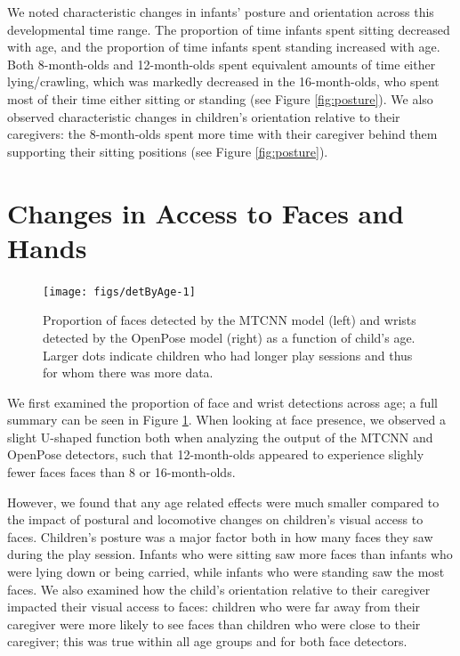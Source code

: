 \documentclass[10pt, letterpaper]{article}
\newenvironment{CodeChunk}{}{}
\begin{document}
We noted characteristic changes in infants' posture and orientation
across this developmental time range. The proportion of time infants
spent sitting decreased with age, and the proportion of time infants
spent standing increased with age. Both 8-month-olds and 12-month-olds
spent equivalent amounts of time either lying/crawling, which was
markedly decreased in the 16-month-olds, who spent most of their time
either sitting or standing (see Figure \ref{fig:posture}). We also
observed characteristic changes in children's orientation relative to
their caregivers: the 8-month-olds spent more time with their caregiver
behind them supporting their sitting positions (see Figure
\ref{fig:posture}).

\section{Changes in Access to Faces and
Hands}\label{changes-in-access-to-faces-and-hands}

\begin{CodeChunk}
\begin{figure}[h]

{\centering \texttt{[image: figs/detByAge-1]} 

}

\caption[Proportion of faces detected by the MTCNN model (left) and wrists detected by the OpenPose model (right) as a function of child's age]{Proportion of faces detected by the MTCNN model (left) and wrists detected by the OpenPose model (right) as a function of child's age. Larger dots indicate children who had longer play sessions and thus for whom there was more data.}\label{fig:detByAge}
\end{figure}
\end{CodeChunk}

We first examined the proportion of face and wrist detections across
age; a full summary can be seen in Figure \ref{fig:detByAge}. When
looking at face presence, we observed a slight U-shaped function both
when analyzing the output of the MTCNN and OpenPose detectors, such that
12-month-olds appeared to experience slighly fewer faces faces than 8 or
16-month-olds.

However, we found that any age related effects were much smaller
compared to the impact of postural and locomotive changes on children's
visual access to faces. Children's posture was a major factor both in
how many faces they saw during the play session. Infants who were
sitting saw more faces than infants who were lying down or being
carried, while infants who were standing saw the most faces. We also
examined how the child's orientation relative to their caregiver
impacted their visual access to faces: children who were far away from
their caregiver were more likely to see faces than children who were
close to their caregiver; this was true within all age groups and for
both face detectors.
\end{document}
